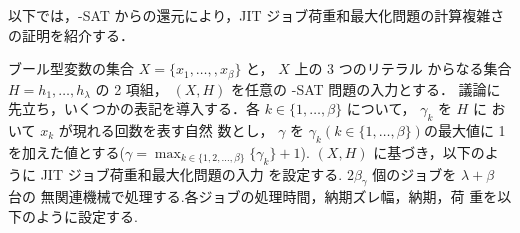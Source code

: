 \documentclass[12pt]{optlab-bachelor}
\begin{document}
以下では，{-SAT} からの還元により，JIT ジョブ荷重和最大化問題の計算複雑さの証明を紹介する．

ブール型変数の集合 $X = \{x_1,\ldots,,x_β\}$ と， $X$ 上の 3 つのリテラル
からなる集合 $H = {h_1,\ldots,h_{\lambda}}$ の 2 項組， $(X,H)$ を任意の
{-SAT} 問題の入力とする．
議論に先立ち，いくつかの表記を導入する．各 $k \in \{1,\ldots,\beta\}$
について， $\gamma_k$ を $H$ に おいて $x_k$ が現れる回数を表す自然
数とし， $\gamma$ を $\gamma_k ( k \in \{1,\ldots,\beta\} )$の最大値に
1 を加えた値とする($\displaystyle \gamma = \max_{k \in \{1,2,\ldots, \beta\}} \{\gamma_k \}+ 1$).
$(X, H)$ に基づき，以下のように JIT ジョブ荷重和最大化問題の入力
を設定する. $2\beta_{\gamma}$ 個のジョブを $\lambda + \beta$ 台の
無関連機械で処理する.各ジョブの処理時間，納期ズレ幅，納期，荷
重を以下のように設定する.
\end{document}
